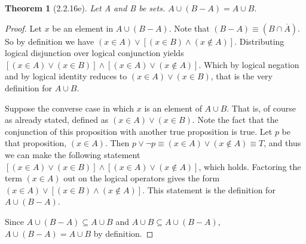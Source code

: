 \documentclass[a4paper, 12pt]{article}
\theoremstyle{plain}
\newtheorem*{theorem*}{Theorem}
\begin{document}
	
	\begin{theorem*}[2.2.16e]
		Let A and B be sets. $A \cup (B - A) = A \cup B$.
	\end{theorem*}
	
	\begin{proof}
		Let $x$ be an element in $A \cup (B - A)$. Note that $(B - A) \equiv (B \cap \overline{A})$. So by definition we have $(x \in A) \lor [(x \in B) \land (x \notin A)]$. Distributing logical disjunction over logical conjunction yields \newline $[(x \in A) \lor (x \in B)] \land [(x \in A) \lor (x \notin A)]$. Which by logical negation and by logical identity reduces to $(x \in A) \lor (x \in B)$, that is the very definition for $A \cup B$.
		
		Suppose the converse case in which  $x$ is an element of $A \cup B$. That is, of course as already stated, defined as $(x \in A) \lor (x \in B)$. Note the fact that the conjunction of this proposition with another true proposition is true. Let $p$ be that proposition, $(x \in A)$. Then $p \lor \lnot p \equiv (x \in A) \lor (x \notin A) \equiv T$, and thus we can make the following statement $[(x \in A) \lor (x \in B)] \land [(x \in A) \lor (x \notin A)]$, which holds. Factoring the term $(x \in A)$ out on the logical operators gives the form $(x \in A) \lor [(x \in B) \land (x \notin A)]$. This statement is the definition for $A \cup (B - A)$.
		
		Since $A \cup (B - A) \subseteq A \cup B$ and $A \cup B \subseteq A \cup (B - A)$, \newline $A \cup (B - A) = A \cup B$ by definition.
	\end{proof}
\end{document}
